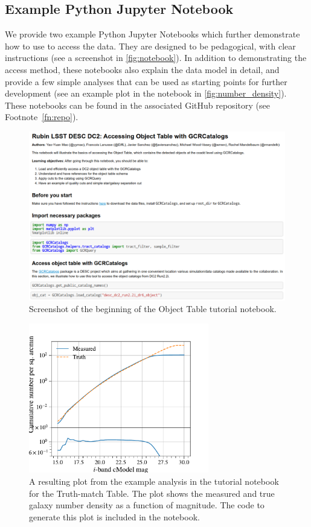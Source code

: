 \documentclass[modern]{descnote}
\begin{document}
\subsection{Example Python Jupyter Notebook}
\label{sec:notebooks}


We provide two example Python Jupyter Notebooks which further demonstrate how to use  to access the data.
They are designed to be pedagogical, with clear instructions (see a screenshot in \autoref{fig:notebook}). In addition to demonstrating the access method, these notebooks also explain the data model in detail, and provide a few simple analyses that can be used as starting points for further development (see an example plot in the notebook in \autoref{fig:number_density}).
These notebooks can be found in the associated GitHub repository (see Footnote~\ref{fn:repo}).

\begin{figure}[tbh!]
    \centering
    \includegraphics[width=\textwidth]{figs/notebook.png}
    \caption{Screenshot of the beginning of the Object Table tutorial notebook.}
    \label{fig:notebook}
\end{figure}

\begin{figure}[tbh!]
    \centering
    \includegraphics[width=0.7\textwidth]{figs/number_density.pdf}
    \caption{A resulting plot from the example analysis in the tutorial notebook for the Truth-match Table. The plot shows the measured and true galaxy number density as a function of magnitude. The code to generate this plot is included in the notebook.}
    \label{fig:number_density}
\end{figure}
\end{document}
